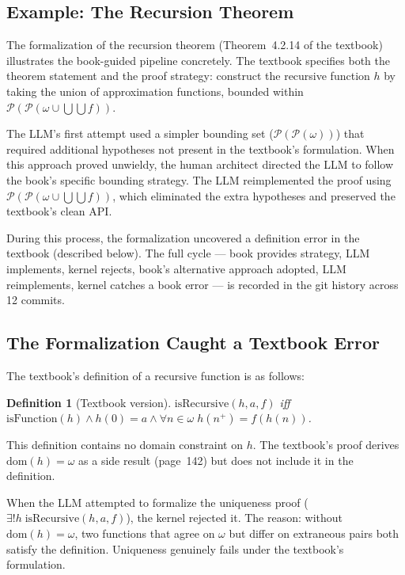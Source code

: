 \documentclass[letterpaper]{article}
\newtheorem{definition}{Definition}
\begin{document}
\subsection{Example: The Recursion Theorem}

The formalization of the recursion theorem (Theorem~4.2.14 of the textbook)
illustrates the book-guided pipeline concretely. The textbook specifies both the theorem
statement and the proof strategy: construct the recursive function $h$ by
taking the union of approximation functions, bounded within
$\mathcal{P}(\mathcal{P}(\omega \cup \bigcup\bigcup f))$.

The LLM's first attempt used a simpler bounding set
($\mathcal{P}(\mathcal{P}(\omega))$) that required additional hypotheses not
present in the textbook's formulation. When this approach proved unwieldy, the
human architect directed the LLM to follow the book's specific bounding
strategy. The LLM reimplemented the proof using
$\mathcal{P}(\mathcal{P}(\omega \cup \bigcup\bigcup f))$, which eliminated
the extra hypotheses and preserved the textbook's clean API.

During this process, the formalization uncovered a definition error in the
textbook (described below). The full cycle --- book provides strategy, LLM
implements, kernel rejects, book's alternative approach adopted, LLM
reimplements, kernel catches a book error --- is recorded in the git history
across 12 commits.

\subsection{The Formalization Caught a Textbook Error}

The textbook's definition of a recursive function is as follows:

\begin{definition}[Textbook version]
$\text{isRecursive}(h, a, f)$ iff $\text{isFunction}(h) \land h(0) = a
\land \forall n \in \omega\; h(n^+) = f(h(n))$.
\end{definition}

This definition contains no domain constraint on $h$. The textbook's proof
derives $\text{dom}(h) = \omega$ as a side result (page~142) but does not
include it in the definition.

When the LLM attempted to formalize the uniqueness proof ($\exists! h\;
\text{isRecursive}(h, a, f)$), the kernel rejected it. The reason:
without $\text{dom}(h) = \omega$, two functions that agree on $\omega$ but
differ on extraneous pairs both satisfy the definition. Uniqueness genuinely
fails under the textbook's formulation.
\end{document}
